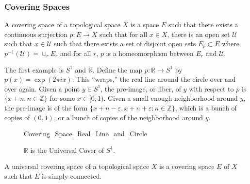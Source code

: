 \documentclass[crop=false,class=book,oneside]{standalone}
\begin{document}
        \subsubsection{Covering Spaces}
            \begin{definition}
                A covering space of a
                topological space $X$
                is a space
                $E$ such that there exists
                a continuous surjection
                $p:E\rightarrow{X}$ such that
                for all $x\in{X}$, there is an
                open set $\mathcal{U}$ such that
                $x\in\mathcal{U}$ such that there
                exists a set of disjoint open sets
                $E_{r}\subset{E}$ where
                $p^{-1}(\mathcal{U})=\cup_{r}E_{r}$
                and for all $r$,
                $p$ is a homeomorphism between
                $E_{r}$ and $\mathcal{U}$.
            \end{definition}
            \begin{example}
                The first example is
                $S^{1}$ and $\mathbb{R}$.
                Define the map
                $p:\mathbb{R}\rightarrow{S^{1}}$
                by $p(x)=\exp(2\pi{i}x)$. This ``wraps,''
                the real line around the circle over and over again.
                Given a point $y\in{S^{1}}$, the pre-image, or fiber,
                of $y$ with respect to $p$ is
                $\{x+n:n\in\mathbb{Z}\}$ for some $x\in[0,1)$.
                Given a small enough neighborhood
                around $y$, the pre-image is of the form
                $\{x+n-\varepsilon,x+n+\varepsilon:n\in\mathbb{Z}\}$,
                which is a bunch of copies of $(0,1)$, or a bunch
                of copies of the neighborhood around $y$.
            \end{example}
            \begin{figure}[H]
                \centering
                \captionsetup{type=figure}
                
                          {Covering_Space_Real_Line_and_Circle}
                \caption{$\mathbb{R}$ is the Universal Cover of $S^{1}$.}
                \label{fig:Surgery_Theory_Reals_Cover_Circle}
            \end{figure}
            \begin{definition}
                A universal covering space of a topological space $X$
                is a covering space $E$ of $X$ such that
                $E$ is simply connected.
            \end{definition}
\end{document}
